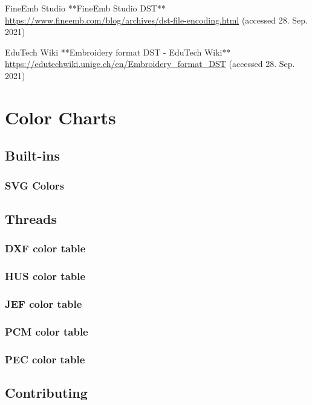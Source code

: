 \documentclass[a4paper]{report}
\begin{document}
FineEmb Studio
**FineEmb Studio \guillemotright DST**
\url{https://www.fineemb.com/blog/archives/dst-file-encoding.html}
(accessed 28. Sep. 2021)

EduTech Wiki
**Embroidery format DST - EduTech Wiki**
\url{https://edutechwiki.unige.ch/en/Embroidery_format_DST}
(accessed 28. Sep. 2021)

\chapter{Color Charts}

\section{Built-ins}

\subsection{SVG Colors}

\section{Threads}

\subsection{DXF color table}

\subsection{HUS color table}

\subsection{JEF color table}

\subsection{PCM color table}

\subsection{PEC color table}

\section{Contributing}
\end{document}
